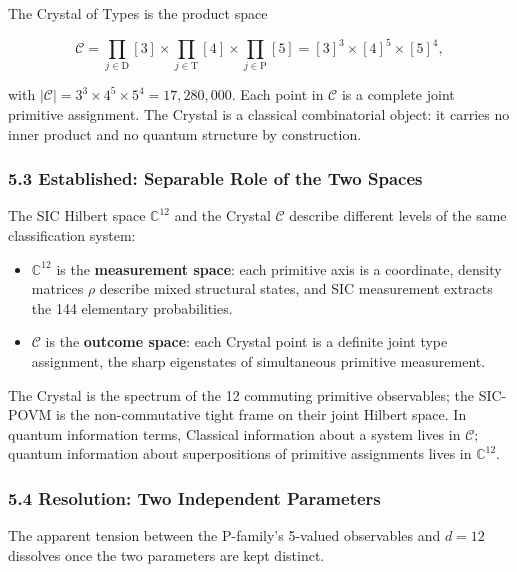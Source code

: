 \documentclass[12pt,a4paper]{article}
\begin{document}
The Crystal of Types is the product space

\[\mathcal{C} = \prod_{j \in \mathrm{D}} [3] \times \prod_{j \in \mathrm{T}} [4] \times \prod_{j \in \mathrm{P}} [5] = [3]^3 \times [4]^5 \times [5]^4,\]

with \(|\mathcal{C}| = 3^3 \times 4^5 \times 5^4 = 17{,}280{,}000\).
Each point in \(\mathcal{C}\) is a complete joint primitive assignment.
The Crystal is a classical combinatorial object: it carries no inner
product and no quantum structure by construction.

\hypertarget{established-separable-role-of-the-two-spaces}{%
\subsubsection{5.3 Established: Separable Role of the Two
Spaces}\label{established-separable-role-of-the-two-spaces}}

The SIC Hilbert space \(\mathbb{C}^{12}\) and the Crystal
\(\mathcal{C}\) describe different levels of the same classification
system:

\begin{itemize}
\tightlist
\item
  \(\mathbb{C}^{12}\) is the \textbf{measurement space}: each primitive
  axis is a coordinate, density matrices \(\rho\) describe mixed
  structural states, and SIC measurement extracts the 144 elementary
  probabilities.
\item
  \(\mathcal{C}\) is the \textbf{outcome space}: each Crystal point is a
  definite joint type assignment, the sharp eigenstates of simultaneous
  primitive measurement.
\end{itemize}

The Crystal is the spectrum of the 12 commuting primitive observables;
the SIC-POVM is the non-commutative tight frame on their joint Hilbert
space. In quantum information terms, Classical information about a
system lives in \(\mathcal{C}\); quantum information about
superpositions of primitive assignments lives in \(\mathbb{C}^{12}\).

\hypertarget{resolution-two-independent-parameters}{%
\subsubsection{5.4 Resolution: Two Independent
Parameters}\label{resolution-two-independent-parameters}}

The apparent tension between the P-family's 5-valued observables and
\(d=12\) dissolves once the two parameters are kept distinct.
\end{document}

